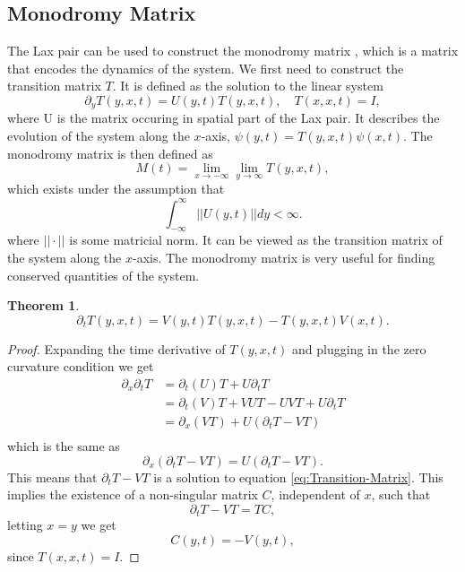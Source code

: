 \documentclass[english,master]{liumaiex}
\theoremstyle{plain}
\newtheorem{theorem}[proposition]{Theorem}
\theoremstyle{definition}
\begin{document}
\subsection{Monodromy Matrix}
The Lax pair can be used to construct the monodromy matrix \cite{Avendano2008,Krishnaswami_2021}, which is a matrix that encodes the dynamics of the system. We first need to construct the transition matrix $T$. It is defined as the solution to the linear system
\begin{equation}
	\partial_y T(y,x,t) = U(y,t) T(y,x,t), \quad T(x,x,t) = I,
\end{equation}
where U is the matrix occuring in spatial part of the Lax pair. It describes the evolution of the system along the $x$-axis, $\psi(y,t) = T(y,x,t) \psi(x, t)$. The monodromy matrix is then defined as
\begin{equation}
	M(t) =
		\lim_{x \rightarrow -\infty} \lim_{y \rightarrow \infty} T(y,x,t),
\end{equation}
which exists under the assumption that
\begin{equation}
	\int_{-\infty}^{\infty} ||U(y,t)|| dy < \infty.
\end{equation}
where $||\cdot||$ is some matricial norm. It can be viewed as the transition matrix of the system along the $x$-axis. The monodromy matrix is very useful for finding conserved quantities of the system.
\begin{theorem}
	\begin{equation} \label{eq:Transition-Matrix}
		\partial_t T(y,x,t) = V(y,t) T(y,x,t) - T(y,x,t) V(x,t).
	\end{equation}
\end{theorem}
\begin{proof}
	Expanding the time derivative of $T(y,x,t)$ and plugging in the zero curvature condition we get
	\begin{equation}
	\begin{aligned}
		\partial_x \partial_t T
			&= \partial_t (U) T + U \partial_t T \\
			&= \partial_t (V)T + VUT - UVT + U \partial_t T \\
			&= \partial_x (VT) + U(\partial_t T - VT) \\
	\end{aligned}
	\end{equation}
	which is the same as
	\begin{equation}
		\partial_x (\partial_t T - VT) = U(\partial_t T - VT).
	\end{equation}
	This means that $\partial_t T - VT$ is a solution to equation \eqref{eq:Transition-Matrix}.
	This implies the existence of a non-singular matrix $C$, independent of $x$, such that
	\begin{equation}
		\partial_t T - VT = TC,
	\end{equation}
	letting $x = y$ we get
	\begin{equation}
		C(y,t) = -V(y,t),
	\end{equation}
	since $T(x,x,t) = I$.
\end{proof}
\end{document}
